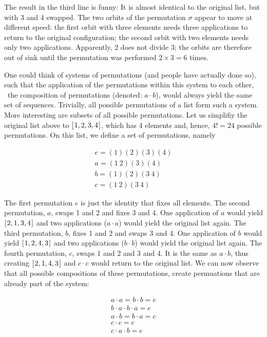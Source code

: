 \documentclass{scrreprt}
\begin{document}
The result in the third line is funny:
It is almost identical to the original list,
but with 3 and 4 swapped.
The two orbits of the permutation $\sigma$
appear to move at different speed:
the first orbit with three elements
needs three applications 
to return to the original configuration;
the second orbit with two elements
needs only two applications.
Apparently, 2 does not divide 3;
the orbits are therefore out of sink
until the permutation was performed $2 \times 3=6$ times.

One could think 
of systems of permutations
(and people have actually done so),
such
that the application of the permutations within this system
to each other,
\ie\ the composition of permutations (denoted: $a \cdot b$),
would always yield the same set of sequences.
Trivially, all possible permutations of a list form such a system.
More interesting are subsets of all possible permutations.
Let us simplifiy the original list above to \ensuremath{[\mskip1.5mu \mathrm{1},\mathrm{2},\mathrm{3},\mathrm{4}\mskip1.5mu]},
which has 4 elements and, hence, $4!=24$ possible permutations.
On this list, we define a set of permutations, namely

\begin{eqnarray}
e = (1)(2)(3)(4)\\
a = (1~2)(3)(4)\\
b = (1)(2)(3~4)\\
c = (1~2)(3~4)
\end{eqnarray}

The first permutation $e$ is just the identity that fixes all elements.
The second permutation, $a$, swaps 1 and 2 and fixes 3 and 4.
One application of $a$ would yield \ensuremath{[\mskip1.5mu \mathrm{2},\mathrm{1},\mathrm{3},\mathrm{4}\mskip1.5mu]}
and two applications ($a \cdot a$) would yield the original list again.
The third permutation, $b$, fixes 1 and 2 and swaps 3 and 4.
One application of $b$ would yield \ensuremath{[\mskip1.5mu \mathrm{1},\mathrm{2},\mathrm{4},\mathrm{3}\mskip1.5mu]}
and two applications ($b \cdot b$) would yield the original list again.
The fourth permutation, $c$, swaps 1 and 2 and 3 and 4.
It is the same as $a \cdot b$, thus creating \ensuremath{[\mskip1.5mu \mathrm{2},\mathrm{1},\mathrm{4},\mathrm{3}\mskip1.5mu]}
and $c \cdot c$ would return to the original list.
We can now observe that all possible compositions of these permutations,
create permuations that are already part of the system:

\begin{eqnarray*}
a \cdot a = b \cdot b = e\\
b \cdot a \cdot b \cdot a = e\\
a \cdot b = b \cdot a = c\\
c \cdot c = e\\
c \cdot a \cdot b = e
\end{eqnarray*}
\end{document}
